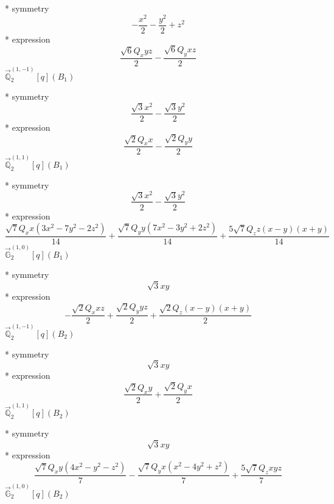 \documentclass[fleqn,8pt]{jsarticle}
\begin{document}
\noindent\quad ** symmetry
\begin{dmath*}
- \frac{x^{2}}{2} - \frac{y^{2}}{2} + z^{2}
\end{dmath*}
\noindent\quad ** expression
\begin{dmath*}
\frac{\sqrt{6} Q_{x} y z}{2} - \frac{\sqrt{6} Q_{y} x z}{2}
\end{dmath*}
\noindent\quad $\vec{\mathbb{Q}}_{2}^{(1,-1)}[q](B_{1})$

\noindent\quad ** symmetry
\begin{dmath*}
\frac{\sqrt{3} x^{2}}{2} - \frac{\sqrt{3} y^{2}}{2}
\end{dmath*}
\noindent\quad ** expression
\begin{dmath*}
\frac{\sqrt{2} Q_{x} x}{2} - \frac{\sqrt{2} Q_{y} y}{2}
\end{dmath*}
\noindent\quad $\vec{\mathbb{Q}}_{2}^{(1,1)}[q](B_{1})$

\noindent\quad ** symmetry
\begin{dmath*}
\frac{\sqrt{3} x^{2}}{2} - \frac{\sqrt{3} y^{2}}{2}
\end{dmath*}
\noindent\quad ** expression
\begin{dmath*}
\frac{\sqrt{7} Q_{x} x \left(3 x^{2} - 7 y^{2} - 2 z^{2}\right)}{14} + \frac{\sqrt{7} Q_{y} y \left(7 x^{2} - 3 y^{2} + 2 z^{2}\right)}{14} + \frac{5 \sqrt{7} Q_{z} z \left(x - y\right) \left(x + y\right)}{14}
\end{dmath*}
\noindent\quad $\vec{\mathbb{G}}_{2}^{(1,0)}[q](B_{1})$

\noindent\quad ** symmetry
\begin{dmath*}
\sqrt{3} x y
\end{dmath*}
\noindent\quad ** expression
\begin{dmath*}
- \frac{\sqrt{2} Q_{x} x z}{2} + \frac{\sqrt{2} Q_{y} y z}{2} + \frac{\sqrt{2} Q_{z} \left(x - y\right) \left(x + y\right)}{2}
\end{dmath*}
\noindent\quad $\vec{\mathbb{Q}}_{2}^{(1,-1)}[q](B_{2})$

\noindent\quad ** symmetry
\begin{dmath*}
\sqrt{3} x y
\end{dmath*}
\noindent\quad ** expression
\begin{dmath*}
\frac{\sqrt{2} Q_{x} y}{2} + \frac{\sqrt{2} Q_{y} x}{2}
\end{dmath*}
\noindent\quad $\vec{\mathbb{Q}}_{2}^{(1,1)}[q](B_{2})$

\noindent\quad ** symmetry
\begin{dmath*}
\sqrt{3} x y
\end{dmath*}
\noindent\quad ** expression
\begin{dmath*}
\frac{\sqrt{7} Q_{x} y \left(4 x^{2} - y^{2} - z^{2}\right)}{7} - \frac{\sqrt{7} Q_{y} x \left(x^{2} - 4 y^{2} + z^{2}\right)}{7} + \frac{5 \sqrt{7} Q_{z} x y z}{7}
\end{dmath*}
\noindent\quad $\vec{\mathbb{G}}_{2}^{(1,0)}[q](B_{2})$
\end{document}
